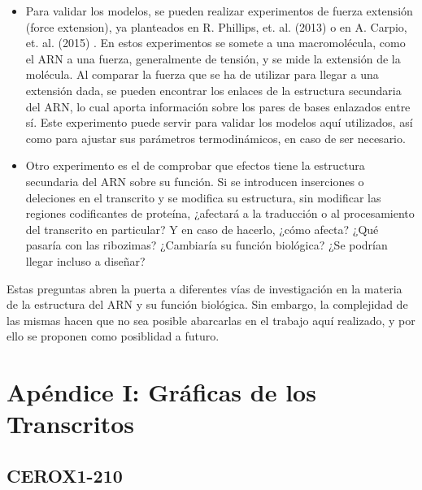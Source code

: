 \documentclass[a4paper,11pt,titlepage]{article}
\theoremstyle{definition}
\begin{document}
\begin{itemize}
    \item Para validar los modelos, se pueden realizar experimentos de fuerza extensión (force extension), ya planteados en R. Phillips, et. al. (2013) \cite{phillips} o en A. Carpio, et. al. (2015) \cite{bonilla}. En estos experimentos se somete a una macromolécula, como el ARN a una fuerza, generalmente de tensión, y se mide la extensión de la molécula. Al comparar la fuerza que se ha de utilizar para llegar a una extensión dada, se pueden encontrar los enlaces de la estructura secundaria del ARN, lo cual aporta información sobre los pares de bases enlazados entre sí. Este experimento puede servir para validar los modelos aquí utilizados, así como para ajustar sus parámetros termodinámicos, en caso de ser necesario.
    \item Otro experimento es el de comprobar que efectos tiene la estructura secundaria del ARN sobre su función. Si se introducen inserciones o deleciones en el transcrito y se modifica su estructura, sin modificar las regiones codificantes de proteína, ¿afectará a la traducción o al procesamiento del transcrito en particular? Y en caso de hacerlo, ¿cómo afecta? ¿Qué pasaría con las ribozimas? ¿Cambiaría su función biológica? ¿Se podrían llegar incluso a diseñar?
\end{itemize}

Estas preguntas abren la puerta a diferentes vías de investigación en la materia de la estructura del ARN y su función biológica. Sin embargo, la complejidad de las mismas hacen que no sea posible abarcarlas en el trabajo aquí realizado, y por ello se proponen como posiblidad a futuro.


\newpage
\newpage
\printbibliography[title=Bibliografía, heading=bibnumbered]\label{sec:refs}

\newpage
\section{Apéndice I: Gráficas de los Transcritos}\label{sec:graphs}

\subsection*{CEROX1-210}\label{subsec:gene1}
\end{document}
